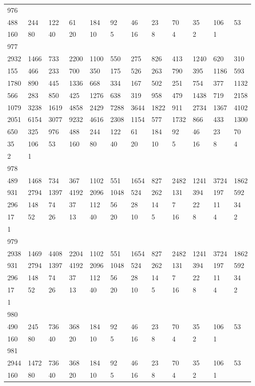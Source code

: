 \begin{longtable}{llllllllllll}
976&&&&&&&&&&&\\
488& 244& 122& 61& 184& 92& 46& 23& 70& 35& 106& 53\\
160& 80& 40& 20& 10& 5& 16& 8& 4& 2& 1& \\

977&&&&&&&&&&&\\
2932& 1466& 733& 2200& 1100& 550& 275& 826& 413& 1240& 620& 310\\
155& 466& 233& 700& 350& 175& 526& 263& 790& 395& 1186& 593\\
1780& 890& 445& 1336& 668& 334& 167& 502& 251& 754& 377& 1132\\
566& 283& 850& 425& 1276& 638& 319& 958& 479& 1438& 719& 2158\\
1079& 3238& 1619& 4858& 2429& 7288& 3644& 1822& 911& 2734& 1367& 4102\\
2051& 6154& 3077& 9232& 4616& 2308& 1154& 577& 1732& 866& 433& 1300\\
650& 325& 976& 488& 244& 122& 61& 184& 92& 46& 23& 70\\
35& 106& 53& 160& 80& 40& 20& 10& 5& 16& 8& 4\\
2& 1& \\

978&&&&&&&&&&&\\
489& 1468& 734& 367& 1102& 551& 1654& 827& 2482& 1241& 3724& 1862\\
931& 2794& 1397& 4192& 2096& 1048& 524& 262& 131& 394& 197& 592\\
296& 148& 74& 37& 112& 56& 28& 14& 7& 22& 11& 34\\
17& 52& 26& 13& 40& 20& 10& 5& 16& 8& 4& 2\\
1& \\

979&&&&&&&&&&&\\
2938& 1469& 4408& 2204& 1102& 551& 1654& 827& 2482& 1241& 3724& 1862\\
931& 2794& 1397& 4192& 2096& 1048& 524& 262& 131& 394& 197& 592\\
296& 148& 74& 37& 112& 56& 28& 14& 7& 22& 11& 34\\
17& 52& 26& 13& 40& 20& 10& 5& 16& 8& 4& 2\\
1& \\

980&&&&&&&&&&&\\
490& 245& 736& 368& 184& 92& 46& 23& 70& 35& 106& 53\\
160& 80& 40& 20& 10& 5& 16& 8& 4& 2& 1& \\

981&&&&&&&&&&&\\
2944& 1472& 736& 368& 184& 92& 46& 23& 70& 35& 106& 53\\
160& 80& 40& 20& 10& 5& 16& 8& 4& 2& 1& \\


\end{longtable}
